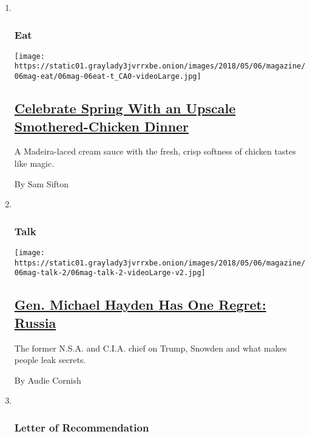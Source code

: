\begin{enumerate}
\def\labelenumi{\arabic{enumi}.}
\item ~
  \hypertarget{eat}{%
  \subsubsection{Eat}\label{eat}}

  \texttt{[image: https://static01.graylady3jvrrxbe.onion/images/2018/05/06/magazine/06mag-eat/06mag-06eat-t\_CA0-videoLarge.jpg]}

  \hypertarget{celebrate-spring-with-an-upscale-smothered-chicken-dinner}{%
  \subsection{\texorpdfstring{\href{/2018/05/01/magazine/spring-smothered-chicken-dinner.html}{Celebrate
  Spring With an Upscale Smothered-Chicken
  Dinner}}{Celebrate Spring With an Upscale Smothered-Chicken Dinner}}\label{celebrate-spring-with-an-upscale-smothered-chicken-dinner}}

  A Madeira-laced cream sauce with the fresh, crisp softness of chicken
  tastes like magic.

  By Sam Sifton
\item ~
  \hypertarget{talk}{%
  \subsubsection{Talk}\label{talk}}

  \texttt{[image: https://static01.graylady3jvrrxbe.onion/images/2018/05/06/magazine/06mag-talk-2/06mag-talk-2-videoLarge-v2.jpg]}

  \hypertarget{gen-michael-hayden-has-one-regret-russia}{%
  \subsection{\texorpdfstring{\href{/2018/05/01/magazine/gen-michael-hayden-has-one-regret-russia.html}{Gen.
  Michael Hayden Has One Regret:
  Russia}}{Gen. Michael Hayden Has One Regret: Russia}}\label{gen-michael-hayden-has-one-regret-russia}}

  The former N.S.A. and C.I.A. chief on Trump, Snowden and what makes
  people leak secrets.

  By Audie Cornish
\item ~
  \hypertarget{letter-of-recommendation}{%
  \subsubsection{Letter of
  Recommendation}\label{letter-of-recommendation}}


\end{enumerate}

